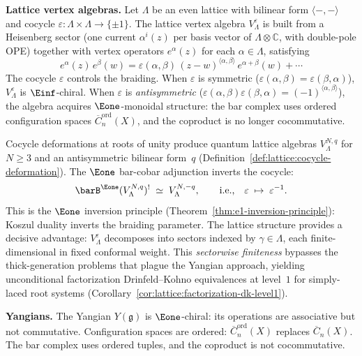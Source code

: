 \medskip
\noindent\textbf{Lattice vertex algebras.}
Let $\Lambda$ be an even lattice with bilinear form
$\langle -,- \rangle$ and cocycle $\varepsilon \colon \Lambda \times
\Lambda \to \{\pm 1\}$. The lattice vertex algebra
$V_\Lambda^\varepsilon$ is built from a Heisenberg sector (one current
$\alpha^i(z)$ per basis vector of $\Lambda \otimes \mathbb{C}$,
with double-pole OPE) together with vertex operators
$e^\alpha(z)$ for each $\alpha \in \Lambda$, satisfying
\[
e^\alpha(z)\,e^\beta(w) = \varepsilon(\alpha,\beta)\,
(z-w)^{\langle\alpha,\beta\rangle}\, e^{\alpha+\beta}(w)
+ \cdots
\]
The cocycle $\varepsilon$ controls the braiding. When $\varepsilon$
is symmetric ($\varepsilon(\alpha,\beta) = \varepsilon(\beta,\alpha)$),
$V_\Lambda^\varepsilon$ is $\Einf$-chiral. When $\varepsilon$ is
\emph{antisymmetric}
($\varepsilon(\alpha,\beta)\varepsilon(\beta,\alpha) = (-1)^{\langle\alpha,\beta\rangle}$),
the algebra acquires $\Eone$-monoidal structure: the bar complex uses
ordered configuration spaces $\overline{C}_n^{\mathrm{ord}}(X)$, and
the coproduct is no longer cocommutative.

Cocycle deformations at roots of unity produce quantum lattice
algebras $V_\Lambda^{N,q}$ for $N \geq 3$ and an antisymmetric
bilinear form~$q$ (Definition~\ref{def:lattice:cocycle-deformation}).
The $\Eone$ bar-cobar adjunction inverts the cocycle:
\begin{equation}\label{eq:frame-e1-inversion}
\barB^{\Eone}(V_\Lambda^{N,q})^!
\;\simeq\;
V_\Lambda^{N,-q},
\qquad
\text{i.e.,}\quad
\varepsilon \;\mapsto\; \varepsilon^{-1}.
\end{equation}
This is the $\Eone$ inversion principle
(Theorem~\ref{thm:e1-inversion-principle}): Koszul duality inverts
the braiding parameter. The lattice structure provides a decisive
advantage: $V_\Lambda^\varepsilon$ decomposes into sectors indexed
by $\gamma \in \Lambda$, each finite-dimensional in fixed conformal
weight. This \emph{sectorwise finiteness} bypasses the
thick-generation problems that plague the Yangian approach, yielding
unconditional factorization Drinfeld--Kohno equivalences at level~$1$
for simply-laced root systems
(Corollary~\ref{cor:lattice:factorization-dk-level1}).

\medskip
\noindent\textbf{Yangians.}
The Yangian $Y(\mathfrak{g})$ is $\Eone$-chiral: its operations are
associative but not commutative. Configuration spaces are
ordered: $\overline{C}_n^{\mathrm{ord}}(X)$ replaces
$\overline{C}_n(X)$. The bar complex uses ordered tuples, and
the coproduct is not cocommutative.

